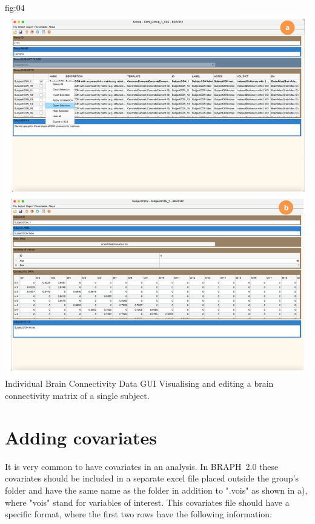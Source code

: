 \documentclass[justified]{tufte-handout}
\begin{document}
	{fig:04}
	{\includegraphics{fig04.png}
	}
	{Individual Brain Connectivity Data GUI}
	{
	Visualising and editing a brain connectivity matrix of a single subject. 
	}


\section{Adding covariates}

It is very common to have covariates in an analysis. In BRAPH~2.0 these covariates should be included in a separate excel file placed outside the group's folder and have the same name as the folder in addition to ".vois" as shown in a), where "vois" stand for variables of interest. This covariates file should have a specific format, where the first two rows have the following information:
\end{document}
